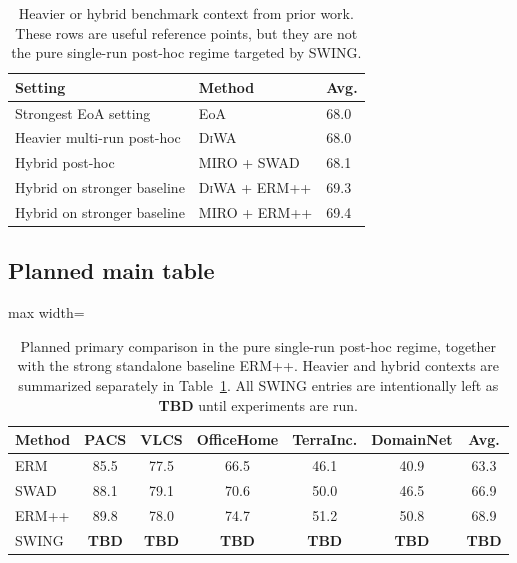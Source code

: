 \documentclass{article}
\newcommand{\TBD}{\textbf{TBD}}
\newcommand{\swing}{\textup{\textsc{SWING}}}
\newcommand{\swad}{\textup{\textsc{SWAD}}}
\newcommand{\diwa}{\textup{\textsc{DiWA}}}
\newcommand{\miro}{\textup{\textsc{MIRO}}}
\newcommand{\erm}{\textup{\textsc{ERM}}}
\begin{document}
\begin{table}[t]
    \centering
    \small
    \begin{tabular}{lll}
        \toprule
        Setting & Method & Avg. \\
        \midrule
        Strongest EoA setting & EoA \citep{arpit2022eoa} & 68.0 \\
        Heavier multi-run post-hoc & \diwa{} \citep{rame2022diwa} & 68.0 \\
        Hybrid post-hoc & \miro{} + \swad{} \citep{cha2022miro} & 68.1 \\
        Hybrid on stronger baseline & \diwa{} + \textsc{ERM++} \citep{teterwak2025ermpp} & 69.3 \\
        Hybrid on stronger baseline & \miro{} + \textsc{ERM++} \citep{teterwak2025ermpp} & 69.4 \\
        \bottomrule
    \end{tabular}
    \caption{Heavier or hybrid benchmark context from prior work. These rows are useful reference points, but they are not the pure single-run post-hoc regime targeted by \swing{}.}
    \label{tab:published_hybrid}
\end{table}

\subsection{Planned main table}

\begin{table}[t]
    \centering
    \small
    \begin{adjustbox}{max width=\linewidth}
    \begin{tabular}{lcccccc}
        \toprule
        Method & PACS & VLCS & OfficeHome & TerraInc. & DomainNet & Avg. \\
        \midrule
        \erm{} & 85.5 & 77.5 & 66.5 & 46.1 & 40.9 & 63.3 \\
        \swad{} & 88.1 & 79.1 & 70.6 & 50.0 & 46.5 & 66.9 \\
        \textsc{ERM++} & 89.8 & 78.0 & 74.7 & 51.2 & 50.8 & 68.9 \\
        \swing{} & \TBD{} & \TBD{} & \TBD{} & \TBD{} & \TBD{} & \TBD{} \\
        \bottomrule
    \end{tabular}
    \end{adjustbox}
    \caption{Planned primary comparison in the pure single-run post-hoc regime, together with the strong standalone baseline \textsc{ERM++}. Heavier and hybrid contexts are summarized separately in Table~\ref{tab:published_hybrid}. All \swing{} entries are intentionally left as \TBD{} until experiments are run.}
    \label{tab:main_tbd}
\end{table}
\end{document}
